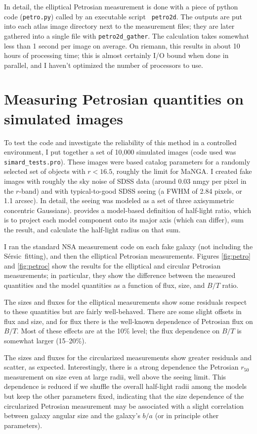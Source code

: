 \documentclass[10pt,preprint]{aastex}
\newcommand{\Sersic}{S\'ersic}
\begin{document}
In detail, the elliptical Petrosian measurement is done with a piece
of python code ({\tt petro.py}) called by an executable script {\tt
  petro2d}. The outputs are put into each atlas image directory next
to the measurement files; they are later gathered into a single file
with {\tt petro2d\_gather}. The calculation takes somewhat less than 1
second per image on average. On riemann, this results in about 10
hours of processing time; this is almost certainly I/O bound when done
in parallel, and I haven't optimized the number of processors to use.

\section{Measuring Petrosian quantities on simulated images} 
\label{sec:models}

To test the code and investigate the reliability of this method in a
controlled environment, I put together a set of 10,000 simulated
images (code used was {\tt simard\_tests.pro}). These images were
based \citet{simard11a} catalog parameters for a randomly selected set
of objects with $r<16.5$, roughly the limit for MaNGA. I created fake
images with roughly the sky noise of SDSS data (around 0.03 nmgy per
pixel in the $r$-band) and with typical-to-good SDSS seeing (a FWHM of
2.84 pixels, or 1.1 arcsec). In detail, the seeing was modeled as a
set of three axisymmetric concentric Gaussians). \citet{simard11a}
provides a model-based definition of half-light ratio, which is to
project each model component onto its major axis (which can differ),
sum the result, and calculate the half-light radius on that sum.

I ran the standard NSA measurement code on each fake galaxy (not
including the \Sersic\ fitting), and then the elliptical Petrosian
measurements. Figures \ref{fig:petro} and \ref{fig:petroc} show the
results for the elliptical and circular Petrosian measurements; in
particular, they show the difference between the measured quantities
and the model quantities as a function of flux, size, and $B/T$
ratio. 

The sizes and fluxes for the elliptical measurements show some
residuals respect to these quantities but are fairly
well-behaved. There are some slight offsets in flux and size, and for
flux there is the well-known dependence of Petrosian flux on
$B/T$. Most of these effects are at the 10\% level; the flux
dependence on $B/T$ is somewhat larger (15--20\%).

The sizes and fluxes for the circularized measurements show greater
residuals and scatter, as expected. Interestingly, there is a strong
dependence the Petrosian $r_{50}$ measurement on size even at large
radii, well above the seeing limit. This dependence is reduced if we
shuffle the overall half-light radii among the models but keep the
other parameters fixed, indicating that the size dependence of the
circularized Petrosian measurement may be associated with a slight
correlation between galaxy angular size and the galaxy's $b/a$ (or in
principle other parameters).
 
\end{document}
